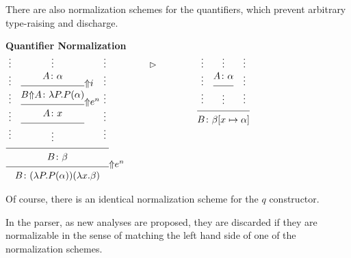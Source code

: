 There are also normalization schemes for the quantifiers, which
prevent arbitrary type-raising and discharge.  
%
\begin{center}
\begin{minipage}{\textwidth}
\begin{center}
{\bf Quantifier Normalization} \\[6pt]
\small
$\infr{\infr{\; \sstc{\vdots \\ \vdots \\ \vdots \\ \vdots \\ \vdots}
             \quad
             \infr{\infr{\infr{\dotsover{\synsem{A}{\alpha}}}
                              {\synsem{\scop{B}{A}}{\lam{P}{P(\alpha)}}}
                              {\qi}
                        }
                        {\synsem{A}{x}}
                        {\qpush{n}}
                  }
                  {\vdots}
                  {}
             \qquad
             \sstc{\vdots \\ \vdots \\ \vdots \\ \vdots \\ \vdots}
             \;
            }
            {\synsem{B}{\beta}}
            {}
      }
      {\synsem{B}{(\lam{P}{P(\alpha)})(\lam{x}{\beta})}}
      {\qpop{n}}
\qquad \qquad \normalizesto \qquad \qquad
\infr{\; \sstc{\vdots \\ \vdots \\ \vdots}
       \quad
       \infr{\dotsover{\synsem{A}{\alpha}}}
            {\vdots}
            {}
       \quad
       \sstc{\vdots \\ \vdots \\ \vdots}
       \; }
      {\synsem{B}{\subst{\beta}{x}{\alpha}}}
      {}
$
\end{center}
\end{minipage}
\end{center}
%
Of course, there is an identical normalization scheme for the $q$
constructor.

In the parser, as new analyses are proposed, they are discarded if
they are normalizable in the sense of matching the left hand side of
one of the normalization schemes. 



